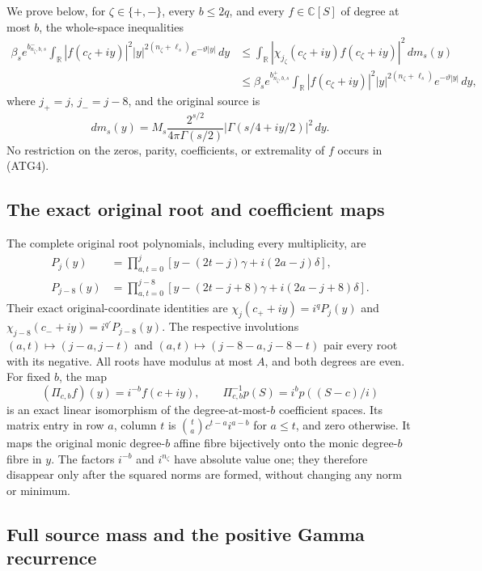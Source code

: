 We prove below, for $\zeta\in\{+,-\}$, every $b\le2q$, and every
$f\in\mathbb C[S]$ of degree at most $b$, the whole-space inequalities
\[
\begin{split}
 \beta_s e^{b^-_{n_\zeta,b,s}}
  \int_{\mathbb R}|f(c_\zeta+iy)|^2
           |y|^{2(n_\zeta+\ell_s)}e^{-\vartheta|y|}\,dy
 &\le\int_{\mathbb R}|\chi_{j_\zeta}(c_\zeta+iy)
                 f(c_\zeta+iy)|^2\,dm_s(y)\\
 &\le\beta_s e^{b^+_{n_\zeta,b,s}}
  \int_{\mathbb R}|f(c_\zeta+iy)|^2
           |y|^{2(n_\zeta+\ell_s)}e^{-\vartheta|y|}\,dy,
\end{split}\tag{ATG4}
\]
where $j_+=j$, $j_-=j-8$, and the original source is
\[
 dm_s(y)=M_s\frac{2^{s/2}}{4\pi\Gamma(s/2)}
                 |\Gamma(s/4+iy/2)|^2\,dy.
\tag{ATG5}
\]
No restriction on the zeros, parity, coefficients, or extremality of
$f$ occurs in (ATG4).

\subsection{The exact original root and coefficient maps}

The complete original root polynomials, including every multiplicity,
are
\[
\begin{split}
 P_j(y)&=\prod_{a,t=0}^{j}
       [y-(2t-j)\gamma+i(2a-j)\delta],\\
 P_{j-8}(y)&=\prod_{a,t=0}^{j-8}
       [y-(2t-j+8)\gamma+i(2a-j+8)\delta].
\end{split}\tag{ATG6}
\]
Their exact original-coordinate identities are
$\chi_j(c_++iy)=i^qP_j(y)$ and
$\chi_{j-8}(c_-+iy)=i^{q'}P_{j-8}(y)$.
The respective involutions $(a,t)\mapsto(j-a,j-t)$ and
$(a,t)\mapsto(j-8-a,j-8-t)$ pair every root with its negative.
All roots have modulus at most $A$, and both degrees are even.
For fixed $b$, the map
\[
 (\Pi_{c,b}f)(y)=i^{-b}f(c+iy),\qquad
 \Pi_{c,b}^{-1}p(S)=i^bp((S-c)/i)
\tag{ATG7}
\]
is an exact linear isomorphism of the degree-at-most-$b$ coefficient
spaces. Its matrix entry in row $a$, column $t$ is
$\binom ta c^{t-a}i^{a-b}$ for $a\le t$, and zero otherwise.
It maps the original monic degree-$b$ affine fibre bijectively onto
the monic degree-$b$ fibre in $y$. The factors $i^{-b}$ and $i^{n_\zeta}$
have absolute value one; they therefore disappear only after the
squared norms are formed, without changing any norm or minimum.

\subsection{Full source mass and the positive Gamma recurrence}

